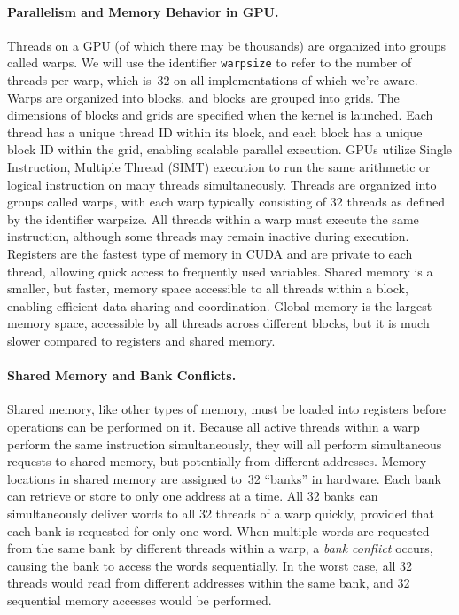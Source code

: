 \paragraph{Parallelism and Memory Behavior in GPU.}
Threads on a GPU (of which there may be thousands) are organized into groups
called warps.
%
We will use the identifier \texttt{warpsize} to refer to the number of threads
per warp, which is~32 on all implementations of which we're aware.
%
Warps are organized into blocks, and blocks are grouped into grids. The dimensions of blocks and grids are specified when the kernel is launched.
%
Each thread has a unique thread ID within its block, and each block has a unique block ID within the grid, enabling scalable parallel execution.
%
GPUs utilize Single Instruction, Multiple Thread (SIMT) execution to run the same arithmetic or logical instruction on many threads simultaneously.
%
Threads are organized into groups called warps, with each warp typically consisting of 32 threads as defined by the identifier warpsize.
%
All threads within a warp must execute the same instruction, although some threads may remain inactive during execution.
%
Registers are the fastest type of memory in CUDA and are private to each thread, allowing quick access to frequently used variables. 
%
Shared memory is a smaller, but faster, memory space accessible to all threads within a block, enabling efficient data sharing and coordination. 
%
Global memory is the largest memory space, accessible by all threads across different blocks, but it is much slower compared to registers and shared memory.

\paragraph{Shared Memory and Bank Conflicts.}
Shared memory, like other types of memory, must be loaded into registers before operations can be performed on it.
%
Because all active threads within a warp perform the same instruction simultaneously, they will all perform simultaneous requests to shared memory, but potentially from different addresses.
%
Memory locations in shared memory are assigned to~32 ``banks'' in hardware.
%
Each bank can retrieve or store to only one address at a time.
%
All 32 banks can simultaneously deliver words to all 32 threads of a warp quickly, provided that each bank is requested for only one word.
%
When multiple words are requested from the same bank by different threads within a warp, a {\em bank conflict} occurs, causing the bank to access the words sequentially.
%
In the worst case, all 32 threads would read from different addresses within the same bank, and 32 sequential memory accesses would be performed.
%

